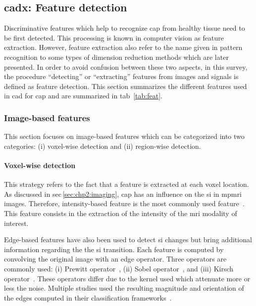 \subsection{\acs*{cadx}: Feature detection} \label{subsec:chp3:img-clas:CADX-fea-dec}

Discriminative features which help to recognize \ac{cap} from healthy tissue need to be first detected.
This processing is known in computer vision as feature extraction. 
However, feature extraction also refer to the name given in pattern recognition to some types of dimension reduction methods which are later presented.
In order to avoid confusion between these two aspects, in this survey, the procedure ``detecting'' or ``extracting'' features from images and signals is defined as feature detection.
This section summarizes the different features used in \ac{cad} for \ac{cap} and are summarized in \acs{tab}~\ref{tab:feat}.  



\subsubsection{Image-based features}\label{subsubsec:chp3:img-clas:CADX-fea-dec:Img-fea}

This section focuses on image-based features which can be categorized into two categories: (i) voxel-wise detection and (ii) region-wise detection.

\paragraph{Voxel-wise detection}
This strategy refers to the fact that a feature is extracted at each voxel location.
As discussed in \acs{sec}\,\ref{sec:chp2:imaging}, \ac{cap} has an influence on the \ac{si} in \ac{mpmri} images.
Therefore, intensity-based feature is the most commonly used feature~\cite{Ampeliotis2007,Ampeliotis2008,Vos2008,rampun2016computerb,rampun2015classifying,Giannini2013,Artan2009,Artan2010,Chan2003,Langer2009,Litjens2011,Litjens2012,Litjens2014,Liu2009,Ozer2009,Ozer2010,trigui2016classification,trigui2017automatic,cameron2014multiparametric,cameron2016maps,khalvati2015automated,chung2015prostate,giannini2015fully,Niaf2011,Niaf2012,lehaire2014computer}.
This feature consists in the extraction of the intensity of the \ac{mri} modality of interest.

Edge-based features have also been used to detect \ac{si} changes but bring additional information regarding the the \ac{si} transition.
Each feature is computed by convolving the original image with an edge operator.
Three operators are commonly used: (i) Prewitt operator~\cite{Prewitt1970}, (ii) Sobel operator~\cite{Sobel1970}, and (iii) Kirsch operator~\cite{Kirsch1971}.
These operators differ due to the kernel used which attenuate more or less the noise.
Multiple studies used the resulting magnitude and orientation of the edges computed in their classification frameworks~\cite{Niaf2011,Niaf2012,Tiwari2009a,Tiwari2010,Tiwari2013,Viswanath2008,Viswanath2011,rampun2016quantitative,rampun2015computer,rampun2016computer,lehaire2014computer,khalvati2015automated,chung2015prostate}.

